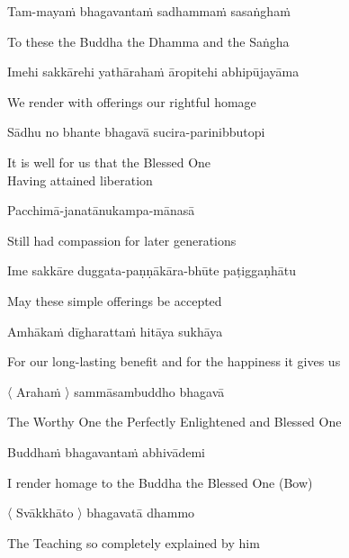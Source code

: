 Tam-mayaṁ bhagavantaṁ sadhammaṁ sasaṅghaṁ

\begin{english}
  To these the Buddha the Dhamma and the Saṅgha
\end{english}

Imehi sakkārehi yathārahaṁ āropitehi abhipūjayāma

\begin{english}
  We render with offerings our rightful homage
\end{english}

Sādhu no bhante bhagavā sucira-parinibbutopi

\begin{english}
  It is well for us that the Blessed One\\
  Having attained liberation
\end{english}

Pacchimā-janatānukampa-mānasā

\begin{english}
  Still had compassion for later generations
\end{english}

Ime sakkāre duggata-paṇṇākāra-bhūte paṭiggaṇhātu

\begin{english}
  May these simple offerings be accepted
\end{english}

Amhākaṁ dīgharattaṁ hitāya sukhāya

\begin{english}
  For our long-lasting benefit and for the happiness it gives us
\end{english}

\clearpage

〈 Arahaṁ 〉 sammāsambuddho bhagavā

\begin{english}
  The Worthy One the Perfectly Enlightened and Blessed One
\end{english}

Buddhaṁ bhagavantaṁ abhivādemi\relax

\begin{english}
  I render homage to the Buddha the Blessed One \hfill{(Bow)}
\end{english}

〈 Svākkhāto 〉 bhagavatā dhammo

\begin{english}
  The Teaching so completely explained by him
\end{english}

